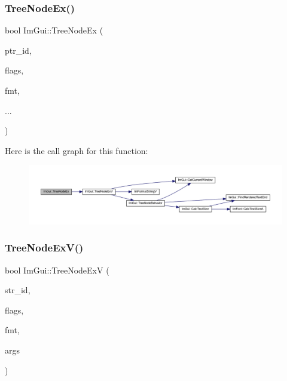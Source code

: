 \subsubsection{\texorpdfstring{Tree\+Node\+Ex()}{TreeNodeEx()}\hspace{0.1cm}{\footnotesize\ttfamily [3/3]}}
{\footnotesize\ttfamily bool Im\+Gui\+::\+Tree\+Node\+Ex (\begin{DoxyParamCaption}\item[{const void $\ast$}]{ptr\+\_\+id,  }\item[{\mbox{\hyperlink{imgui_8h_a0588fdd10c59b49a0159484fe9ec4564}{Im\+Gui\+Tree\+Node\+Flags}}}]{flags,  }\item[{const char $\ast$}]{fmt,  }\item[{}]{... }\end{DoxyParamCaption})}

Here is the call graph for this function\+:
\nopagebreak
\begin{figure}[H]
\begin{center}
\leavevmode
\includegraphics[width=350pt]{namespace_im_gui_adce362ad94baa9b00f5914cbcab00452_cgraph}
\end{center}
\end{figure}
\mbox{\label{namespace_im_gui_a251cd4acbdad4cef2246d9b573a83ce0}} 
\subsubsection{\texorpdfstring{Tree\+Node\+Ex\+V()}{TreeNodeExV()}\hspace{0.1cm}{\footnotesize\ttfamily [1/2]}}
{\footnotesize\ttfamily bool Im\+Gui\+::\+Tree\+Node\+ExV (\begin{DoxyParamCaption}\item[{const char $\ast$}]{str\+\_\+id,  }\item[{\mbox{\hyperlink{imgui_8h_a0588fdd10c59b49a0159484fe9ec4564}{Im\+Gui\+Tree\+Node\+Flags}}}]{flags,  }\item[{const char $\ast$}]{fmt,  }\item[{va\+\_\+list}]{args }\end{DoxyParamCaption})}

